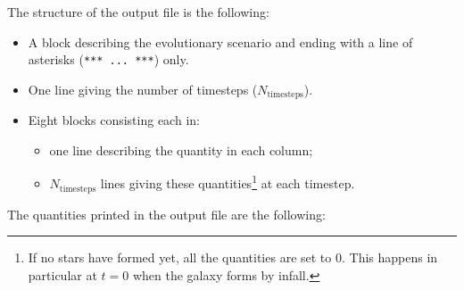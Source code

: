 \documentclass[11pt,draft,fleqn]{article}
\begin{document}
The structure of the output file is the following:
\begin{itemize}
\item A block describing the evolutionary scenario and ending with a
line of asterisks (\texttt{*** ... ***}) only.
\item One line giving the number of timesteps ($N_{\mathrm{timesteps}}$).
\item Eight blocks consisting each in:
\begin{itemize}
\item
one line describing the quantity in
each column;
\item
$N_{\mathrm{timesteps}}$ lines giving these quantities\footnote{If no
stars have formed yet, all the quantities are
set to $0$. This happens in particular at $t=0$ when the galaxy
forms by infall.} at each timestep.
\end{itemize}
\end{itemize}
The quantities printed in the output file are the following:
\end{document}
